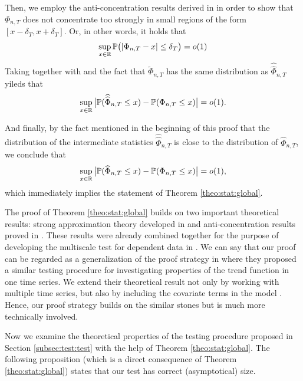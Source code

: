 \documentclass[a4paper,12pt]{article}
\makeatletter
\renewcommand{\eqref}[1]{\tagform@{\ref{#1}}}
\newcommand{\doublehattwo}[1]{\widehat{\widehat{#1}}}
\makeatother
\begin{document}
Then, we employ the anti-concentration results derived in \cite{Chernozhukov2015} in order to show that $\Phi_{n,T}$ does not concentrate too strongly in small regions of the form $[x-\delta_T,x+\delta_T]$. Or, in other words, it holds that 
\begin{align}\label{eq:proof2}
\sup_{x \in \mathbb{R}} \mathbb{P} \big( | \Phi_{n,T} - x | \le \delta_T \big) = o(1)
\end{align}
Taking \eqref{eq:proof1} together with \eqref{eq:proof2} and the fact that $\widetilde{\Phi}_{n, T}$ has the same distribution as $\doublehattwo{\Phi}_{n, T}$ yileds that 
\begin{equation*}
\sup_{x \in \reals} \big| \pr(\doublehattwo{\Phi}_{n, T} \le x) - \pr(\Phi_{n,T} \le x) \big| = o(1). 
\end{equation*}
 
And finally, by the fact mentioned in the beginning of this proof that the distribution of the intermediate statistics $\doublehattwo{\Phi}_{n, T}$ is close to the distribution of $\widehat{\Phi}_{n, T}$, we conclude that 
\begin{equation*}
\sup_{x \in \mathbb{R}} \big| \mathbb{P}(\widehat{\Phi}_{n, T} \le x) - \mathbb{P}(\Phi_{n,T} \le x) \big| = o(1),
\end{equation*}
which immediately implies the statement of Theorem \ref{theo:stat:global}.

\begin{remark}
The proof of Theorem \ref{theo:stat:global} builds on two important theoretical results: strong approximation theory developed in \cite{BerkesLiuWu2014} and anti-concentration results proved in \cite{Chernozhukov2015}. These results were already combined together for the purpose of developing the multiscale test for dependent data in \cite{KhismatullinaVogt2020}. We can say that our proof can be regarded as a generalization of the proof strategy in \cite{KhismatullinaVogt2020} where they proposed a similar testing procedure for investigating properties of the trend function in one time series. We extend their theoretical result not only by working with multiple time series, but also by including the covariate terms in the model \eqref{eq:model}. Hence, our proof strategy builds on the similar stones but is much more technically involved.
\end{remark}

Now we examine the theoretical properties of the testing procedure proposed in Section \ref{subsec:test:test} with the help of Theorem \ref{theo:stat:global}. The following proposition (which is a direct consequence of Theorem \ref{theo:stat:global}) states that our test has correct (asymptotical) size.
\end{document}

